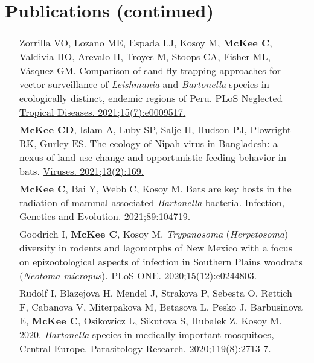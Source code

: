 \documentclass[letterpaper]{deedy-resume} %
\newcommand{\spread}{\vspace{1mm}}
\begin{document}
\section{Publications (continued)}
\begin{tabular}{>{\raggedright\arraybackslash}p{2cm}p{16cm}}

2021 & Zorrilla VO, Lozano ME, Espada LJ, Kosoy M, \textbf{McKee C}, Valdivia HO, Arevalo H, Troyes M, Stoops CA, Fisher ML, Vásquez GM. Comparison of sand fly trapping approaches for vector surveillance of \textit{Leishmania} and \textit{Bartonella} species in ecologically distinct, endemic regions of Peru. \href{https://doi.org/10.1371/journal.pntd.0009517}{\textcolor{special}{PLoS Neglected Tropical Diseases. 2021;15(7):e0009517}.} \spread \\

2021 & \textbf{McKee CD}, Islam A, Luby SP, Salje H, Hudson PJ, Plowright RK, Gurley ES. The ecology of Nipah virus in Bangladesh: a nexus of land-use change and opportunistic feeding behavior in bats. \href{https://doi.org/10.3390/v13020169}{\textcolor{special}{Viruses. 2021;13(2):169}.} \spread \vspace{-4mm} \\  %

2021 & \textbf{McKee C}, Bai Y, Webb C, Kosoy M. Bats are key hosts in the radiation of mammal-associated \textit{Bartonella} bacteria. \href{https://doi.org/10.1016/j.meegid.2021.104719}{\textcolor{special}{Infection, Genetics and Evolution. 2021;89:104719}.} \spread \\

2020 & Goodrich I, \textbf{McKee C}, Kosoy M. \textit{Trypanosoma} (\textit{Herpetosoma}) diversity in rodents and lagomorphs of New Mexico with a focus on epizootological aspects of infection in Southern Plains woodrats (\textit{Neotoma micropus}). \href{https://dx.plos.org/10.1371/journal.pone.0244803}{\textcolor{special}{PLoS ONE. 2020;15(12):e0244803}.} \spread \\

2020 & Rudolf I, Blazejova H, Mendel J, Strakova P, Sebesta O, Rettich F, Cabanova V, Miterpakova M, Betasova L, Pesko J, Barbusinova E, \textbf{McKee C}, Osikowicz L, Sikutova S, Hubalek Z, Kosoy M. 2020. \textit{Bartonella} species in medically important mosquitoes, Central Europe. \href{https://doi.org/10.1007/s00436-020-06732-1}{\textcolor{special}{Parasitology Research. 2020;119(8):2713-7}.} \spread \\


\end{tabular}
\end{document}
